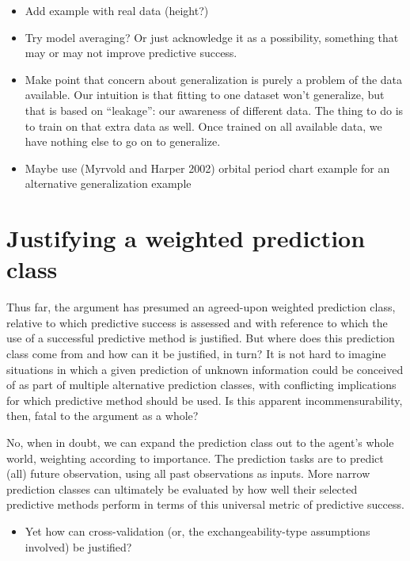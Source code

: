 \documentclass[
  letterpaper,
  DIV=11,
  numbers=noendperiod]{scrartcl}
\providecommand{\tightlist}{%
  \setlength{\itemsep}{0pt}\setlength{\parskip}{0pt}}
\theoremstyle{definition}
\theoremstyle{remark}
\begin{document}
\begin{itemize}
\tightlist
\item
  Add example with real data (height?)
\item
  Try model averaging? Or just acknowledge it as a possibility,
  something that may or may not improve predictive success.
\item
  Make point that concern about generalization is purely a problem of
  the data available. Our intuition is that fitting to one dataset won't
  generalize, but that is based on ``leakage'': our awareness of
  different data. The thing to do is to train on that extra data as
  well. Once trained on all available data, we have nothing else to go
  on to generalize.
\item
  Maybe use (Myrvold and Harper 2002) orbital period chart example for
  an alternative generalization example
\end{itemize}

\section{Justifying a weighted prediction class}\label{sec-class}

Thus far, the argument has presumed an agreed-upon weighted prediction
class, relative to which predictive success is assessed and with
reference to which the use of a successful predictive method is
justified. But where does this prediction class come from and how can it
be justified, in turn? It is not hard to imagine situations in which a
given prediction of unknown information could be conceived of as part of
multiple alternative prediction classes, with conflicting implications
for which predictive method should be used. Is this apparent
incommensurability, then, fatal to the argument as a whole?

No, when in doubt, we can expand the prediction class out to the agent's
whole world, weighting according to importance. The prediction tasks are
to predict (all) future observation, using all past observations as
inputs. More narrow prediction classes can ultimately be evaluated by
how well their selected predictive methods perform in terms of this
universal metric of predictive success.

\begin{itemize}
\tightlist
\item
  Yet how can cross-validation (or, the exchangeability-type assumptions
  involved) be justified?
\end{itemize}
\end{document}

